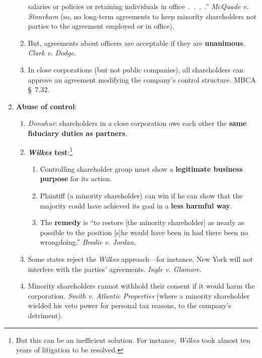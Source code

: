 \begin{enumerate}
\begin{enumerate}
        salaries or policies or retaining individuals in office~.~.~.~.'' 
        \emph{McQuade v. Stoneham} (so, no long-term agreements to keep 
        minority shareholders not parties to the agreement employed or in 
        office).
        \item But, agreements about officers are acceptable if they are 
        \textbf{unanimous}. \emph{Clark v. Dodge}.
        \item In close corporations (but not public companies), all 
        shareholders can approve an agreement modifying the company's control 
        structure. MBCA \S\ 7.32.
    \end{enumerate}
    \item \textbf{Abuse of control}:
    \begin{enumerate}
        \item \emph{Donahue}: shareholders in a close corporation owe each 
        other the \textbf{same fiduciary duties as partners}.
        \item \textbf{\emph{Wilkes} test}:\footnote{But this can be an 
        inefficient solution. For instance, \emph{Wilkes} took almost ten 
        years of litigation to be resolved.}
        \begin{enumerate}
            \item Controlling shareholder group must show a \textbf{legitimate 
            business purpose} for its action.
            \item Plaintiff (a minority shareholder) can win if he can show 
            that the majority could have achieved its goal in a \textbf{less 
            harmful way}.
            \item The \textbf{remedy} is ``to restore [the minority 
            shareholder] as nearly as possible to the position [s]he would 
            have been in had there been no wrongdoing.'' \emph{Brodie v. 
            Jordan}.
        \end{enumerate}
        \item Some states reject the \emph{Wilkes} approach---for instance, 
        New York will not interfere with the parties' agreements. \emph{Ingle 
        v. Glamore}.
        \item Minority shareholders cannot withhold their consent if it would 
        harm the corporation. \emph{Smith v. Atlantic Properties} (where a 
        minority shareholder wielded his veto power for personal tax reasons, 
        to the company's detriment).
    \end{enumerate}

\end{enumerate}
